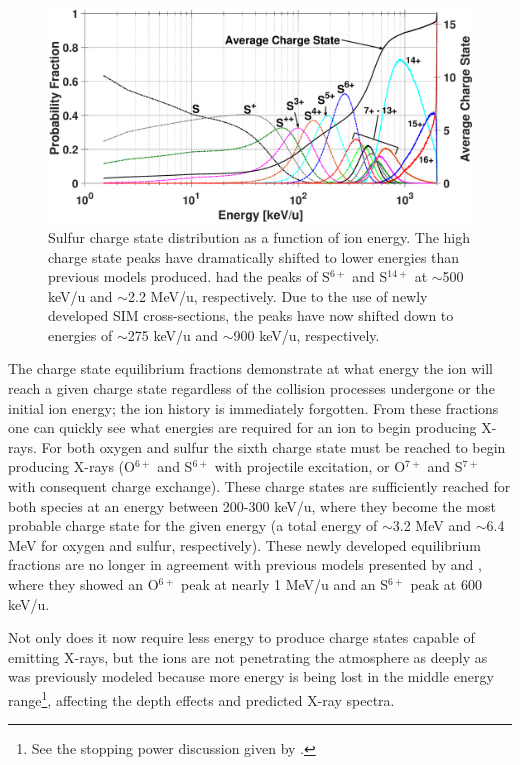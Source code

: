 \documentclass[draft]{agujournal2018}
\begin{document}
\begin{figure}[ht]
    \centering
    \includegraphics[width=\textwidth]{Figures/CSDsul.eps}
    \caption{Sulfur charge state distribution as a function of ion energy. The high charge state peaks have dramatically shifted to lower energies than previous models produced. \citet{ozak2010} had the peaks of S$^{6+}$ and S$^{14+}$ at $\sim$500 keV/u and $\sim$2.2 MeV/u, respectively. Due to the use of newly developed SIM cross-sections, the peaks have now shifted down to energies of $\sim$275 keV/u and $\sim$900 keV/u, respectively.}
    \label{fig:CSDsul}
\end{figure}

The charge state equilibrium fractions demonstrate at what energy the ion will reach a given charge state regardless of the collision processes undergone or the initial ion energy; the ion history is immediately forgotten.
From these fractions one can quickly see what energies are required for an ion to begin producing X-rays.
For both oxygen and sulfur the sixth charge state must be reached to begin producing X-rays (O$^{6+}$ and S$^{6+}$ with projectile excitation, or O$^{7+}$ and S$^{7+}$ with consequent charge exchange).
These charge states are sufficiently reached for both species at an energy between 200-300 keV/u, where they become the most probable charge state for the given energy (a total energy of $\sim$3.2 MeV and $\sim$6.4 MeV for oxygen and sulfur, respectively).
These newly developed equilibrium fractions are no longer in agreement with previous models presented by \citet{ozak2010} and \citet{houston2018}, where they showed an O$^{6+}$ peak at nearly 1 MeV/u and an S$^{6+}$ peak at 600 keV/u.

Not only does it now require less energy to produce charge states capable of emitting X-rays, but the ions are not penetrating the atmosphere as deeply as was previously modeled because more energy is being lost in the middle energy range\footnote{See the stopping power discussion given by \citet{schultz2019}.}, affecting the depth effects and predicted X-ray spectra.
\end{document}

